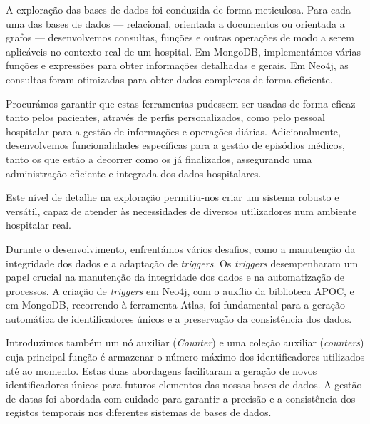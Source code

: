 A exploração das bases de dados foi conduzida de forma meticulosa. Para cada uma das bases de dados — relacional, orientada a documentos ou orientada a grafos — desenvolvemos consultas, funções e outras operações de modo a serem aplicáveis no contexto real de um hospital. Em MongoDB, implementámos várias funções e expressões para obter informações detalhadas e gerais. Em Neo4j, as consultas foram otimizadas para obter dados complexos de forma eficiente.

Procurámos garantir que estas ferramentas pudessem ser usadas de forma eficaz tanto pelos pacientes, através de perfis personalizados, como pelo pessoal hospitalar para a gestão de informações e operações diárias. Adicionalmente, desenvolvemos funcionalidades específicas para a gestão de episódios médicos, tanto os que estão a decorrer como os já finalizados, assegurando uma administração eficiente e integrada dos dados hospitalares.

Este nível de detalhe na exploração permitiu-nos criar um sistema robusto e versátil, capaz de atender às necessidades de diversos utilizadores num ambiente hospitalar real.

Durante o desenvolvimento, enfrentámos vários desafios, como a manutenção da integridade dos dados e a adaptação de \textit{triggers}. Os \textit{triggers} desempenharam um papel crucial na manutenção da integridade dos dados e na automatização de processos. A criação de \textit{triggers} em Neo4j, com o auxílio da biblioteca APOC, e em MongoDB, recorrendo à ferramenta Atlas, foi fundamental para a geração automática de identificadores únicos e a preservação da consistência dos dados.

Introduzimos também um nó auxiliar (\textit{Counter}) e uma coleção auxiliar (\textit{counters}) cuja principal função é armazenar o número máximo dos identificadores utilizados até ao momento. Estas duas abordagens facilitaram a geração de novos identificadores únicos para futuros elementos das nossas bases de dados. A gestão de datas foi abordada com cuidado para garantir a precisão e a consistência dos registos temporais nos diferentes sistemas de bases de dados.